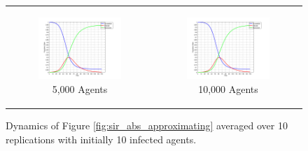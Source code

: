 \begin{figure}
\begin{center}
\begin{tabular}{c c}
    	\\
    	
		\begin{subfigure}[b]{0.3\textwidth}
			\centering
			\includegraphics[width=1\textwidth, angle=0]{./shared/fig/frabs/SIR_5000agents_150t_01dt_NOSS_parallel_10replications.png}
			\caption{5,000 Agents}
			\label{fig:sir_abs_agents_repls_5000}
		\end{subfigure}
		&
		\begin{subfigure}[b]{0.3\textwidth}
			\centering
			\includegraphics[width=1\textwidth, angle=0]{./shared/fig/frabs/SIR_10000agents_150t_01dt_NOSS_parallel_4replications.png}
			\caption{10,000 Agents}
			\label{fig:sir_abs_agents_repls_10000}
		\end{subfigure}
	\end{tabular}
	
	\caption{Dynamics of Figure \ref{fig:sir_abs_approximating} averaged over 10 replications with initially 10 infected agents.} 
	\label{fig:sir_abs_agents_repls}
\end{center}
\end{figure}

